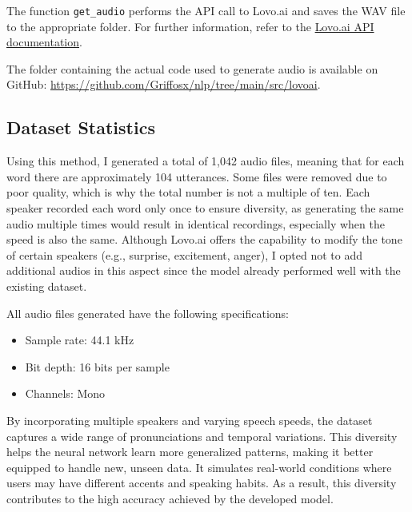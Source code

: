 \documentclass[12pt]{article}
\begin{document}
The function \texttt{get\_audio} performs the API call to Lovo.ai and saves the WAV file to the appropriate folder. For further information, refer to the \href{https://docs.genny.lovo.ai/reference/intro/getting-started}{Lovo.ai API documentation}.

The folder containing the actual code used to generate audio is available on GitHub: \href{https://github.com/Griffosx/nlp/tree/main/src/lovoai}{https://github.com/Griffosx/nlp/tree/main/src/lovoai}.

\subsection{Dataset Statistics}

Using this method, I generated a total of 1,042 audio files, meaning that for each word there are approximately 104 utterances. Some files were removed due to poor quality, which is why the total number is not a multiple of ten. Each speaker recorded each word only once to ensure diversity, as generating the same audio multiple times would result in identical recordings, especially when the speed is also the same. Although Lovo.ai offers the capability to modify the tone of certain speakers (e.g., surprise, excitement, anger), I opted not to add additional audios in this aspect since the model already performed well with the existing dataset.

All audio files generated have the following specifications:

\begin{itemize}
    \item Sample rate: 44.1 kHz
    \item Bit depth: 16 bits per sample
    \item Channels: Mono
\end{itemize}

By incorporating multiple speakers and varying speech speeds, the dataset captures a wide range of pronunciations and temporal variations. This diversity helps the neural network learn more generalized patterns, making it better equipped to handle new, unseen data. It simulates real-world conditions where users may have different accents and speaking habits. As a result, this diversity contributes to the high accuracy achieved by the developed model.


\newpage


\end{document}
